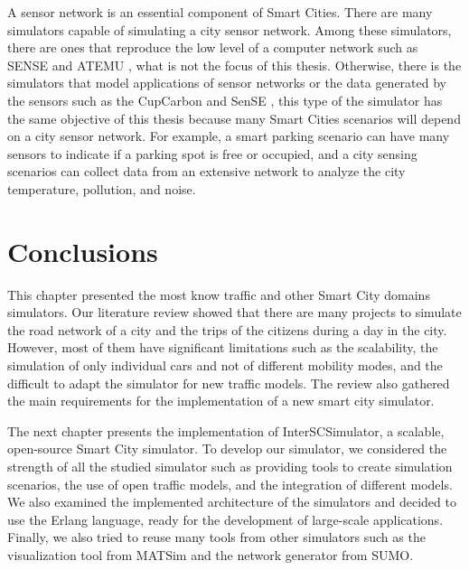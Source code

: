 A sensor network is an essential component of Smart Cities. There are many simulators capable of simulating a city sensor network. Among these simulators, there are ones that reproduce the low level of a computer network such as SENSE \cite{chen2005sense} and ATEMU \cite{polley2004atemu}, what is not the focus of this thesis. Otherwise, there is the simulators that model applications of sensor networks or the data generated by the sensors such as the CupCarbon \cite{mehdi2014cupcarbon} and SenSE \cite{zyrianoff2017sense}, this type of the simulator has the same objective of this thesis because many Smart Cities scenarios will depend on a city sensor network. For example, a smart parking scenario can have many sensors to indicate if a parking spot is free or occupied, and a city sensing scenarios can collect data from an extensive network to analyze the city temperature, pollution, and noise.

\section{Conclusions}
\label{sec:rev_conclusoes}

This chapter presented the most know traffic and other Smart City domains simulators. Our literature review showed that there are many projects to simulate the road network of a city and the trips of the citizens during a day in the city. However, most of them have significant limitations such as the scalability, the simulation of only individual cars and not of different mobility modes, and the difficult to adapt the simulator for new traffic models. The review also gathered the main requirements for the implementation of a new smart city simulator.

The next chapter presents the implementation of InterSCSimulator, a scalable, open-source Smart City simulator. To develop our simulator, we considered the strength of all the studied simulator such as providing tools to create simulation scenarios, the use of open traffic models, and the integration of different models. We also examined the implemented architecture of the simulators and decided to use the Erlang language, ready for the development of large-scale applications. Finally, we also tried to reuse many tools from other simulators such as the visualization tool from MATSim and the network generator from SUMO.
